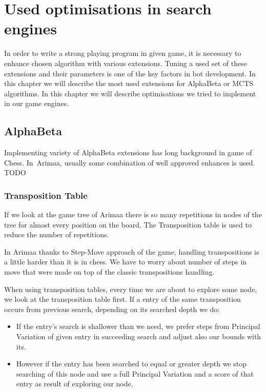 \chapter{Used optimisations in search engines}

In order to write a strong playing program in given game, it is necessary to
enhance chosen algorithm with various extensions. Tuning a used set of these
extensions and their parameters is one of the key factors in bot development.
In this chapter we will describe the most used extensions for AlphaBeta or MCTS
algorithms. In this chapter we will describe optimisations we tried to
implement in our game engines.

\section{AlphaBeta}
Implementing variety of AlphaBeta extensions has long background in game of
Chess. In~Arimaa, usually some combination of well approved enhances is
used. TODO

\subsection{Transposition Table}\label{AlphaBeta:TT}
If we look at the game tree of Arimaa there is so many repetitions in nodes of
the tree for almost every position on the board. The Transposition table is
used to reduce the number of repetitions.

In Arimaa thanks to Step-Move approach of the game, handling transpositions is
a little harder than it is in chess. We have to worry about number of steps in
move that were made on top of the classic transpositions handling.

When using transposition tables, every time we are about to explore some node,
we look at the transposition table first. If a entry of the same transposition
occurs from previous search, depending on its searched depth we do:

\begin{itemize}
\item If the entry's search is shallower than we need, we prefer steps from
Principal Variation of given entry in succeeding search and adjust also our
bounds with its.
\item However if the entry has been searched to equal or greater depth we stop
searching of this node and use a full Principal Variation and a score of that
entry as result of exploring our node.
\end{itemize}

